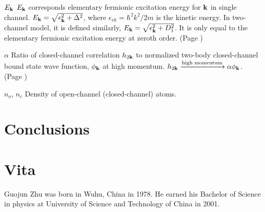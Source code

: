 \documentclass[edeposit,fullpage,prequest]{uiucthesis2009}
\begin{document}
\begin{symbollist}[0.7in]
\item[$E_{\mathbf{k}}$] $E_{\mathbf{k}}$ corresponds elementary fermionic excitation energy for $\mathbf{k}$ in single channel.  $E_{\mathbf{k}}=\sqrt{\epsilon_{\mathbf{k}}^{2}+\Delta^{2}}$, where $\epsilon_{vk}=\hbar^{2}k^{2}/2m$ is the kinetic energy. In two-channel model, it is defined similarly, $E_{\mathbf{k}}=\sqrt{\epsilon_{\mathbf{k}}^{2}+D_{1}^{2}}$.  It is only equal to the elementary fermionic excitation energy at zeroth order. (Page \pageref{eq:pathInt:G0})
\item[$\alpha$]  Ratio of closed-channel correlation $h_{2\mathbf{k}}$ to normalized two-body closed-channel bound state wave function, $\phi_{\mathbf{k}}$ at high momentum.  $h_{2\mathbf{k}}\xrightarrow{\text{high momentum}}\alpha\phi_{\mathbf{k}}$. (Page \pageref{eq:pathInt2:hphi})
\item[$n_{o}$, $n_{c}$] Density of open-channel (closed-channel) atoms. 
\end{symbollist}

\mainmatter




\chapter{Conclusions\label{ch:conclusion}}


\appendix

%



\backmatter



\chapter{Vita}

Guojun  Zhu was born in Wuhu, China in 1978.  He earned his Bachelor of Science in physics at University of Science and Technology of China in 2001.  
\end{document}
